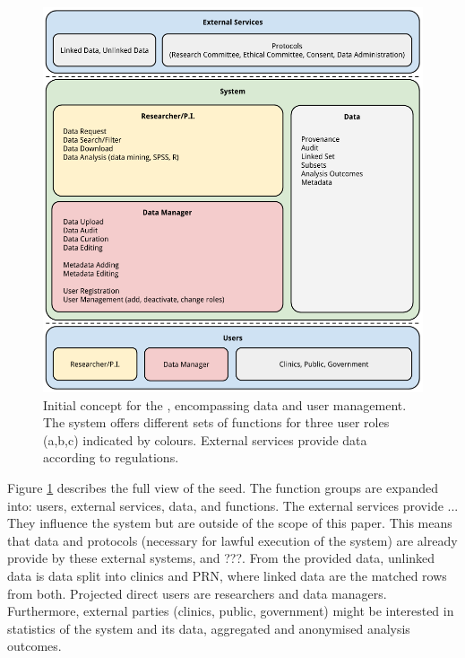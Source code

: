 		
\begin{figure}[t]
	\centering
	\includegraphics[width=1.0\linewidth]{images/brainstorm-before}
	\caption{
		Initial concept for the \ivfsystem{}, encompassing data and user management. 
		The system offers different sets of functions for three user roles (a,b,c) indicated by colours. 
		External services provide data according to regulations.
	}
	\label{fig:brainstorm-before}
\end{figure}

Figure \ref{fig:brainstorm-before} describes the full view of the seed. The function groups are expanded into: users, external services, data, and functions.
The external services provide ...
They influence the system but are outside of the scope of this paper.
This means that data and protocols (necessary for lawful execution of the system) 
are already provide by these external systems, and ???.
From the provided data, unlinked data is \project{} data split into clinics and PRN, where linked data are the matched rows from both.
Projected direct users are researchers and data managers.
Furthermore, external parties (clinics, public, government) might be interested in statistics of the system and its data, \eg{} aggregated and anonymised analysis outcomes.

